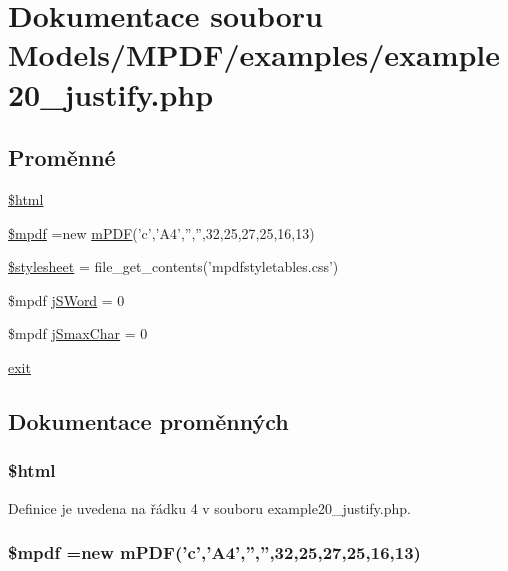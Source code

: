 \hypertarget{example20__justify_8php}{\section{Dokumentace souboru Models/\-M\-P\-D\-F/examples/example20\-\_\-justify.php}
\label{example20__justify_8php}
}
\subsection*{Proměnné}
\begin{DoxyCompactItemize}
\item 
\hyperlink{example20__justify_8php_a6f96e7fc92441776c9d1cd3386663b40}{\$html}
\item 
\hyperlink{example20__justify_8php_ad028f81910d6cbab9b184d2214b3a8f8}{\$mpdf} =new \hyperlink{classm_p_d_f}{m\-P\-D\-F}('c','A4','','',32,25,27,25,16,13)
\item 
\hyperlink{example20__justify_8php_a19e5cf73e817c55a49205e6ec78c88a8}{\$stylesheet} = file\-\_\-get\-\_\-contents('mpdfstyletables.\-css')
\item 
\$mpdf \hyperlink{example20__justify_8php_aa76c1542a6a06552e112e7c9e63ef8eb}{j\-S\-Word} = 0
\item 
\$mpdf \hyperlink{example20__justify_8php_adbe88fd58b98ddbc5784838af76215ff}{j\-Smax\-Char} = 0
\item 
\hyperlink{example20__justify_8php_a6733eb5f605d09eaede9845835d71c4e}{exit}
\end{DoxyCompactItemize}


\subsection{Dokumentace proměnných}
\hypertarget{example20__justify_8php_a6f96e7fc92441776c9d1cd3386663b40}{
\subsubsection[{\$html}]{\setlength{\rightskip}{0pt plus 5cm}\$html}}\label{example20__justify_8php_a6f96e7fc92441776c9d1cd3386663b40}


Definice je uvedena na řádku 4 v souboru example20\-\_\-justify.\-php.

\hypertarget{example20__justify_8php_ad028f81910d6cbab9b184d2214b3a8f8}{
\subsubsection[{\$mpdf}]{\setlength{\rightskip}{0pt plus 5cm}\$mpdf =new {\bf m\-P\-D\-F}('c','A4','','',32,25,27,25,16,13)}}\label{example20__justify_8php_ad028f81910d6cbab9b184d2214b3a8f8}


